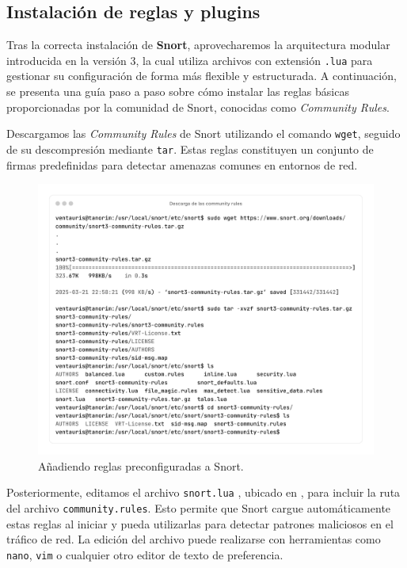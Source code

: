 \documentclass[11pt,a4paper,twoside]{report}
\begin{document}

\newpage

\subsection{Instalación de reglas y plugins}

Tras la correcta instalación de \textbf{Snort}, aprovecharemos la arquitectura modular introducida en la versión 3, la cual utiliza archivos con extensión \texttt{.lua} para gestionar su configuración de forma más flexible y estructurada. A continuación, se presenta una guía paso a paso sobre cómo instalar las reglas básicas proporcionadas por la comunidad de Snort, conocidas como \textit{Community Rules}.
\newline

Descargamos las \textit{Community Rules} de Snort utilizando el comando \texttt{wget}, seguido de su descompresión mediante \texttt{tar}. Estas reglas constituyen un conjunto de firmas predefinidas para detectar amenazas comunes en entornos de red.

\begin{figure}[H]
	\centering
	\includegraphics[scale=0.12]{instalacion_reglas_snort/1-1.png}
	\caption{Añadiendo reglas preconfiguradas a Snort.}
\end{figure}

\pagebreak

Posteriormente, editamos el archivo \texttt{snort.lua} \cite{snort_user_manual}, ubicado en , para incluir la ruta del archivo \texttt{community.rules}. Esto permite que Snort cargue automáticamente estas reglas al iniciar y pueda utilizarlas para detectar patrones maliciosos en el tráfico de red. La edición del archivo puede realizarse con herramientas como \texttt{nano}, \texttt{vim} o cualquier otro editor de texto de preferencia.
\end{document}
